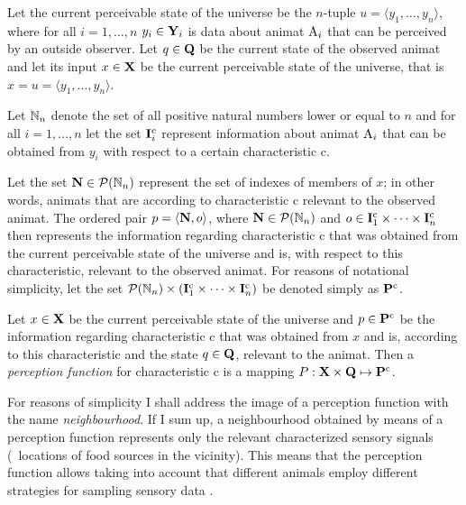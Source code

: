 Let the current perceivable state of the universe be the $n$-tuple  $u=\langle y_1,\ldots,y_n\rangle$, where for all $i=1,\ldots,n$ $y_i \in {\ensuremath{\mathbf{Y}}}_i$ is data about animat ${\mathrm{A}}_i$ that can be perceived by an outside observer. Let $q \in {\ensuremath{\mathbf{Q}}}$ be the current state of the observed animat and let its input $x \in {\ensuremath{\mathbf{X}}}$ be the current perceivable state of the universe, that is  $x=u=\langle y_1,\ldots,y_n \rangle$. 

Let $\mathbb{N}_n$ denote the set of all positive natural numbers lower or equal to $n$ and for all $i=1,\ldots,n$ let the set ${\mathbf{I}}^\mathrm{c}_i$ represent information about animat ${\mathrm{A}}_i$ that can be obtained from $y_i$ with respect to a certain characteristic $\mathrm{c}$. 

Let the set ${\mathbf{N}} \in {\ensuremath{\mathcal{P}(\mathbb{N}_n)}}$ represent the set of indexes of members of $x$; in other words, animats that are according to characteristic $\mathrm{c}$ relevant to the observed animat. The ordered pair $p=\langle{\ensuremath{\mathbf{N}}},o\rangle$, where ${\mathbf{N}} \in {\ensuremath{\mathcal{P}(\mathbb{N}_n)}}$ and $o \in {\ensuremath{\mathbf{I}}}^\mathrm{c}_1 \times \cdots \times {\ensuremath{\mathbf{I}}}^\mathrm{c}_n$ then represents the information regarding characteristic $\mathrm{c}$ that was obtained from the current perceivable state of the universe and is, with respect to this characteristic, relevant to the observed animat. For reasons of notational simplicity, let the set ${\mathcal{P}(\mathbb{N}_n)} \times ({\mathbf{I}}^\mathrm{c}_1 \times \cdots \times {\ensuremath{\mathbf{I}}}^\mathrm{c}_n)$ be denoted simply as ${\mathbf{P}}^\mathrm{c}$. 

\begin{defn}
\label{def:animat:Pi}
Let $x \in {\ensuremath{\mathbf{X}}}$ be the current perceivable state of the universe and $p \in {\ensuremath{\mathbf{P}}}^\mathrm{c}$ be the information regarding characteristic $\mathrm{c}$ that was obtained from $x$ and is, according to this characteristic and the state $q \in {\ensuremath{\mathbf{Q}}}$, relevant to the animat. Then a \emph{perception function} for characteristic $\mathrm{c}$ is a mapping $P: {\mathbf{X}} \times {\ensuremath{\mathbf{Q}}} \mapsto {\ensuremath{\mathbf{P}}}^\mathrm{c}$.
\end{defn}

For reasons of simplicity I shall address the image of a perception function with the name \emph{neighbourhood}. If I sum up, a neighbourhood obtained by means of a perception function represents only the relevant characterized sensory signals (\eg\ locations of food sources in the vicinity). This means that the perception function allows taking into account that different animals employ different strategies for sampling sensory data \cite{cliff:1993}. 

